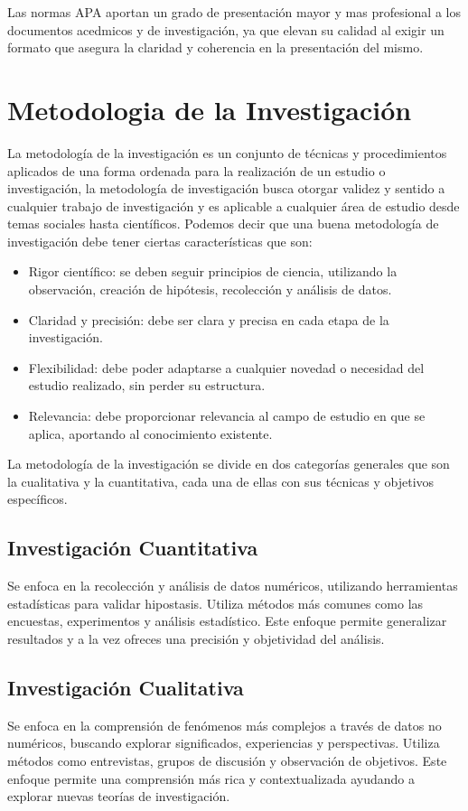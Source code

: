 \documentclass[12pt]{article}
\begin{document}
Las normas APA aportan un grado de presentación mayor y mas profesional a los documentos acedmicos y de investigación, ya que elevan su calidad al exigir un formato que asegura la claridad y coherencia en la presentación del mismo.


\section*{Metodologia de la Investigación}

La metodología de la investigación es un conjunto de técnicas y procedimientos aplicados de una forma ordenada para la realización de un estudio o investigación, la metodología de investigación busca otorgar validez y sentido a cualquier trabajo de investigación y es aplicable a cualquier área de estudio desde temas sociales hasta científicos.
Podemos decir que una buena metodología de investigación debe tener ciertas características que son:
\begin{itemize}
\item Rigor científico: se deben seguir principios de ciencia, utilizando la observación, creación de hipótesis, recolección y análisis de datos.
\item Claridad y precisión: debe ser clara y precisa en cada etapa de la investigación.
\item Flexibilidad: debe poder adaptarse a cualquier novedad o necesidad del estudio realizado, sin perder su estructura.
\item Relevancia: debe proporcionar relevancia al campo de estudio en que se aplica, aportando al conocimiento existente.
\end{itemize}

La metodología de la investigación se divide en dos categorías generales que son la cualitativa y la cuantitativa, cada una de ellas con sus técnicas y objetivos específicos.

\subsection*{ Investigación Cuantitativa}
Se enfoca en la recolección y análisis de datos numéricos, utilizando herramientas estadísticas para validar hipostasis. Utiliza métodos más comunes como las encuestas, experimentos y análisis estadístico. Este enfoque permite generalizar resultados y a la vez ofreces una precisión y objetividad del análisis.

\subsection*{Investigación Cualitativa}
Se enfoca en la comprensión de fenómenos más complejos a través de datos no numéricos, buscando explorar significados, experiencias y perspectivas. Utiliza métodos como entrevistas, grupos de discusión y observación de objetivos. Este enfoque permite una comprensión más rica y contextualizada ayudando a explorar nuevas teorías de investigación.
\end{document}

